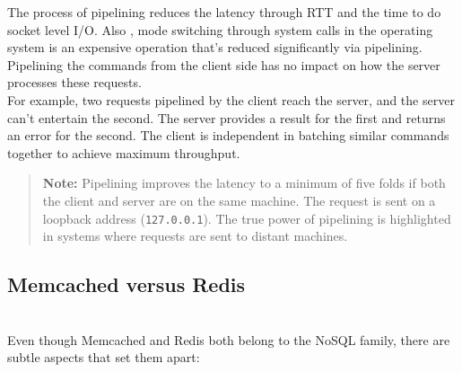 The process of pipelining reduces the latency through RTT and the time to do socket level I/O. Also , mode switching through system calls in the operating system is an expensive operation that's reduced significantly via pipelining. Pipelining the commands from the client side has no impact on how the server processes these requests.
\\
For example, two requests pipelined by the client reach the server, and the server can't entertain the second. The server provides a result for the first and returns an error for the second. The client is independent in batching similar commands together to achieve maximum throughput.
\begin{quote}
\textbf{Note:} Pipelining improves the latency to a minimum of five folds if both the client and server are on the same machine. The request is sent on a loopback address (\texttt{127.0.0.1}). The true power of pipelining is highlighted in systems where requests are sent to distant machines.
\end{quote}
\subsection{Memcached versus Redis}\label{X49kIBN1bZWQZ5_BeJLAN}
\\
Even though Memcached and Redis both belong to the NoSQL family, there are subtle aspects that set them apart:

